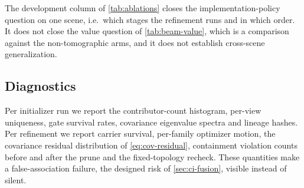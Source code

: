 The development column of \cref{tab:ablations} closes the implementation-policy question
on one scene, i.e.\ which stages the refinement runs and in which order.  It does not
close the value question of \cref{tab:beam-value}, which is a comparison against the
non-tomographic arms, and it does not establish cross-scene generalization.

\subsection{Diagnostics}
\label{sec:diagnostics}

Per initializer run we report the contributor-count histogram, per-view uniqueness, gate
survival rates, covariance eigenvalue spectra and lineage hashes.  Per refinement we
report carrier survival, per-family optimizer motion, the covariance residual
distribution of \cref{eq:cov-residual}, containment violation counts before and after the
prune and the fixed-topology recheck.  These quantities make a false-association failure,
the designed risk of \cref{sec:ci-fusion}, visible instead of silent.

\begin{figure}[t]
  \centering
  \caption{}
  \label{fig:beam-diagnostics}
\end{figure}

